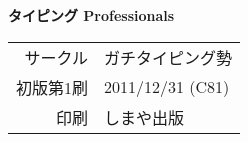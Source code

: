 \documentclass[a4j,twoside,twocolumn]{jsarticle}
\begin{document}
\clearpage





\clearpage

\thispagestyle{empty}
\section*{} %

\clearpage
\thispagestyle{empty}
\section*{} %
\vfill{}

\begin{Large}
\textsf{\textbf{タイピング Professionals}}
\end{Large}

\hrulefill
\vspace{2mm}

\begin{tabular}{rl}
\textsf{サークル}& ガチタイピング勢 \\
\textsf{初版第1刷}& 2011/12/31 (C81) \\
\textsf{印刷}& しまや出版 \\
\end{tabular}

\vspace{2mm}
\hrulefill
\end{document}
